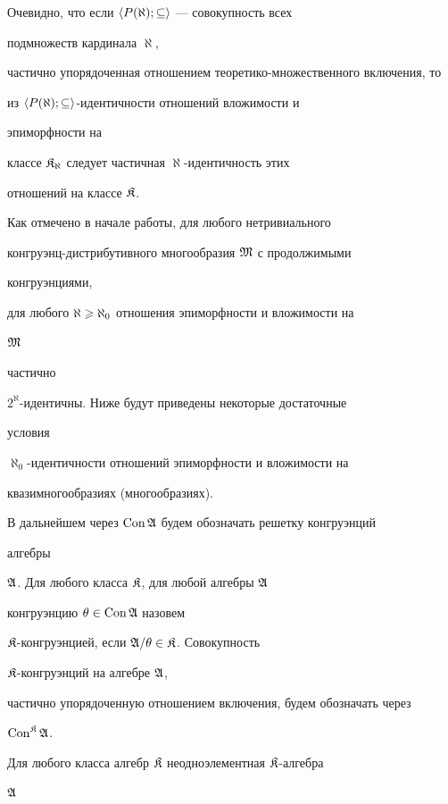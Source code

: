 Очевидно, что если $\langle P(\aleph);\subseteq\rangle$ --- совокупность всех


подмножеств кардинала $\aleph$,


частично упорядоченная отношением теоретико-множественного включения, то


из $\langle P(\aleph);\subseteq\rangle$-идентичности отношений вложимости и


эпиморфности на


классе $\frak K_{\aleph}$ следует частичная $\aleph$-идентичность этих


отношений на классе $\frak K$.





Как отмечено в начале работы, для любого нетривиального


конгруэнц-дистрибутивного многообразия $\frak M$ с продолжимыми


конгруэнциями,


для любого $\aleph\geqslant\aleph_0$ отношения эпиморфности и вложимости на


$\frak M$


частично


$2^{\aleph}$-идентичны. Ниже будут приведены некоторые достаточные


условия


$\aleph_0$-идентичности отношений эпиморфности и вложимости на


квазимногообразиях (многообразиях).





В дальнейшем через $\operatorname{Con}\frak A$ будем обозначать решетку конгруэнций


алгебры


$\frak A$. Для любого класса $\frak K$, для любой алгебры $\frak A$


конгруэнцию $\theta\in\operatorname{Con}\frak A$ назовем


$\frak K$-конгруэнцией, если $\frak A/\theta\in\frak K$. Совокупность


$\frak K$-конгруэнций на алгебре $\frak A$,


частично упорядоченную отношением включения, будем обозначать через


$\operatorname{Con}^{\frak K}\frak A$.





Для любого класса алгебр $\frak K$ неодноэлементная $\frak K$-алгебра


$\frak A$



